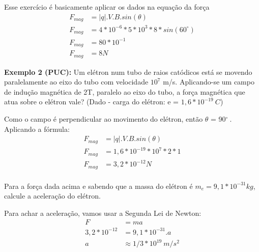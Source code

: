 \documentclass[12pt]{extarticle}
\newcommand{\grad}{$^{\circ}\:$}
\newcommand{\<}{\langle}
\renewcommand{\>}{\rangle}
\theoremstyle{definition}
\begin{document}
Esse exercício é basicamente aplicar os dados na equação da força
\begin{align*}
    F_{mag} &= |q|.V.B.sin(\theta) \\
    F_{mag} &= 4*10^{-6}*5*10^3*8*sin(60^{\circ}) \\
    F_{mag} &= 80*10^{-1} \\
    F_{mag} &= 8 N
\end{align*}

\textbf{Exemplo 2 (PUC):} Um elétron num tubo de raios catódicos está se movendo paralelamente ao eixo do tubo com velocidade $10^7$ m/s. Aplicando-se um campo de indução magnética de 2T, paralelo ao eixo do tubo, a força magnética que atua sobre o elétron vale?
(Dado - carga do elétron: e = $1,6*10^{-19} \:C$)

Como o campo é perpendicular ao movimento do elétron, então $\theta$ = 90\grad. Aplicando a fórmula:
\begin{align*}
    F_{mag}&= |q|.V.B.sin(\theta) \\
    F_{mag} &= 1,6*10^{-19}*10^7*2*1 \\
    F_{mag} &= 3,2*10^{-12} N\\
\end{align*}

Para a força dada acima e sabendo que a massa do elétron é $m_e = 9,1*10^{-31} kg$, calcule a aceleração do elétron.

Para achar a aceleração, vamos usar a Segunda Lei de Newton:
\begin{align*}
    F &= ma \\
    3,2*10^{-12} &= 9,1*10^{-31}.a \\
    a &\approx 1/3 *10^{19} \: m/s^2
\end{align*}
\end{document}
